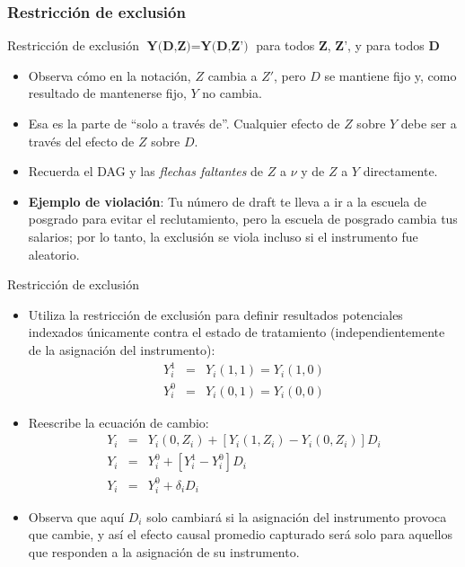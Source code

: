 \documentclass{beamer}
\begin{document}
\begin{frame}[plain]
\frametitle{Restricción de exclusión}

	\begin{block}{Restricción de exclusión}
	$\textbf{Y(D,Z)}=\textbf{Y(D,Z')}$ para todos $\textbf{Z}$, $\textbf{Z'}$, y para todos $\textbf{D}$
	\end{block}
	
\begin{itemize}
\item Observa cómo en la notación, $Z$ cambia a $Z'$, pero $D$ se mantiene fijo y, como resultado de mantenerse fijo, $Y$ no cambia.
\item Esa es la parte de ``solo a través de''. Cualquier efecto de $Z$ sobre $Y$ debe ser a través del efecto de $Z$ sobre $D$.
\item Recuerda el DAG y las \emph{flechas faltantes} de $Z$ a $\nu$ y de $Z$ a $Y$ directamente.
\item \textbf{Ejemplo de violación}: Tu número de draft te lleva a ir a la escuela de posgrado para evitar el reclutamiento, pero la escuela de posgrado cambia tus salarios; por lo tanto, la exclusión se viola incluso si el instrumento fue aleatorio.
\end{itemize}
	
\end{frame}

\begin{frame}[allowframebreaks]{Restricción de exclusión}
	
	\begin{itemize}
	\item Utiliza la restricción de exclusión para definir resultados potenciales indexados únicamente contra el estado de tratamiento (independientemente de la asignación del instrumento): 
		\begin{eqnarray*}
		 Y^1_{i} &=& Y_i(1,1) = Y_i(1,0) \\
		 Y^0_{i} &=& Y_i(0,1) = Y_i(0,0)
		\end{eqnarray*}
	\item Reescribe la ecuación de cambio:
		\begin{eqnarray*}
		Y_i &=& Y_i(0,Z_i) + [Y_i(1,Z_i) - Y_i(0,Z_i)]D_i \\
		Y_i &=& Y^0_{i} + [Y^1_{i} - Y^0_{i}]D_i \\
		Y_i &=& Y^0_i + \delta_iD_i
		\end{eqnarray*}
	\item Observa que aquí $D_i$ solo cambiará si la asignación del instrumento provoca que cambie, y así el efecto causal promedio capturado será solo para aquellos que responden a la asignación de su instrumento.
	\end{itemize}

\end{frame}
\end{document}
